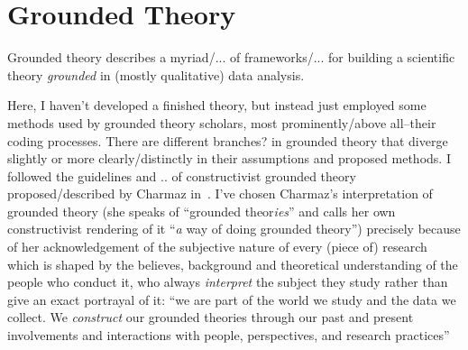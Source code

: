 \begin{comment}
vgl \cite{GeiHal2017}
iterative mixed method
combination of:
* quantitative methods: mining big data sets/computational social science
"begin with one or
more large (but often thin) datasets generated by a software platform, which has recorded digital
traces that users leave in interacting on that platform. Such researchers then seek to mine as much
signal and significance from these found datasets as they can at scale in order to answer a research
question"
* more traditional social science/qualitative methods, e.g. interviews, observations, experiments

\cite{Geiger2014}
"the idea that Wikipedia only takes place on wiki-
pedia.org – or even entirely on the Internet – is a huge misunderstanding (Konieczny, 2009;
Reagle, 2010). Wikipedia is not a virtual world, especially one located entirely on the wiki."
e.g. in order to get hold of abuse_filter_history I had to engage with
- wikipedia.org
- mediawiki.org
- irc channels
- phabricator
- gerrit
- toolserver/cloudservices
----
other spaces Wikipedia takes place
- mailinglists
- WomenEdit/offenes Editieren @Wikimedia
- Wikimania
- Wikimedia's office and daily work
\end{comment}

\section{Grounded Theory}
\label{sec:gt}

Grounded theory describes a myriad/... of frameworks/... for building a scientific theory \emph{grounded} in (mostly qualitative) data analysis.

Here, I haven't developed a finished theory,
but instead just employed some methods used by grounded theory %
scholars, most prominently/above all–their coding processes.
There are different branches? in grounded theory that diverge slightly or more clearly/distinctly in their assumptions and proposed methods.
I followed the guidelines and .. of constructivist grounded theory proposed/described by Charmaz in~\cite{Charmaz2006}.
I've chosen Charmaz's interpretation of grounded theory (she speaks of ``grounded theor\emph{ies}'' and calls her own constructivist rendering of it ``\emph{a} way of doing grounded theory'') precisely because of her acknowledgement of the subjective nature of every (piece of) research which is shaped by the believes, background and theoretical understanding of the people who conduct it, who always \emph{interpret} the subject they study rather than give an exact portrayal of it:
``we are part of the world we study and the data we collect. We \textit{construct} our grounded theories through our past and present involvements and interactions with people, perspectives, and research practices''~\cite[p.10]{Charmaz2006}

